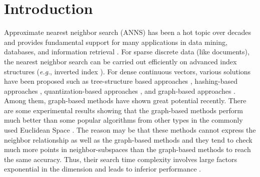 \documentclass{vldb}
\def\eg {\emph{e.g}.} \def\Eg{\emph{E.g}.}
\begin{document}
\section{Introduction}
Approximate nearest neighbor search (ANNS) has been a hot topic over decades and provides fundamental support for many applications in data mining, databases, and information retrieval \cite{HuangFZFN15,AroraSK018,teodoro2014approximate,zheng2016lazylsh,de2002efficient,chen2005robust}. For sparse discrete data (like documents), the nearest neighbor search can be carried out efficiently on advanced index structures (\eg , inverted index \cite{Manning2008Introduction}). For dense continuous vectors, various solutions have been proposed such as tree-structure based approaches \cite{Bentley1975Multidimensional, Silpaanan2008Optimised, Fukunaga1975A, jagadish2005idistance, beckmann1990r, AroraSK018}, hashing-based approaches \cite{Gionis1999Similarity, Weiss2008Spectral, gao2014dsh, liu2014sk, HuangFZFN15}, quantization-based approaches \cite{jegou2011product, weber1998quantitative, ge2013optimized, andre2015cache}, and graph-based approaches \cite{Hajebi2011Fast, arya1993approximate, wu2014fast, malkov2014approximate}. Among them, graph-based methods have shown great potential recently. There are some experimental results showing that the graph-based methods perform much better than some popular algorithms from other types in the commonly used Euclidean Space \cite{Jin2014Fast, malkov2014approximate, MalkovYHNSW16, Ben2016Fanng, AroraSK018, CongEfanna2016}. The reason may be that these methods cannot express the neighbor relationship as well as the graph-based methods and they tend to check much more points in neighbor-subspaces than the graph-based methods to reach the same accuracy\cite{weber1998quantitative}. Thus, their search time complexity involves large factors exponential in the dimension and leads to inferior performance \cite{har2012approximate}.
\end{document}
